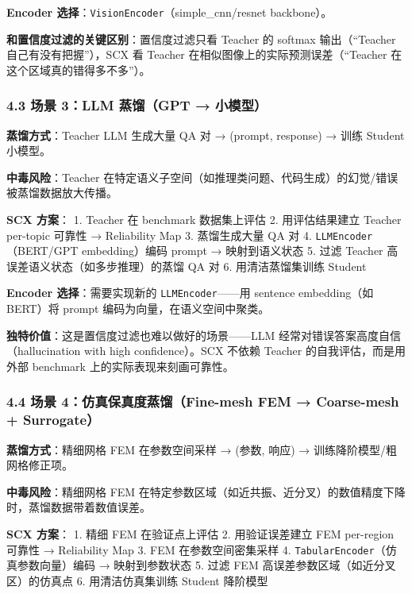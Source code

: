 \documentclass[
  12pt,
]{ctexart}
\begin{document}
\textbf{Encoder 选择}：\texttt{VisionEncoder}（simple\_cnn/resnet
backbone）。

\textbf{和置信度过滤的关键区别}：置信度过滤只看 Teacher 的 softmax
输出（``Teacher 自己有没有把握''），SCX 看 Teacher
在相似图像上的实际预测误差（``Teacher 在这个区域真的错得多不多''）。

\subsubsection{4.3 场景 3：LLM 蒸馏（GPT →
小模型）}\label{ux573aux666f-3llm-ux84b8ux998fgpt-ux5c0fux6a21ux578b}

\textbf{蒸馏方式}：Teacher LLM 生成大量 QA 对 → (prompt, response) →
训练 Student 小模型。

\textbf{中毒风险}：Teacher
在特定语义子空间（如推理类问题、代码生成）的幻觉/错误被蒸馏数据放大传播。

\textbf{SCX 方案}： 1. Teacher 在 benchmark 数据集上评估 2.
用评估结果建立 Teacher per-topic 可靠性 → Reliability Map 3.
蒸馏生成大量 QA 对 4. \texttt{LLMEncoder}（BERT/GPT embedding）编码
prompt → 映射到语义状态 5. 过滤 Teacher
高误差语义状态（如多步推理）的蒸馏 QA 对 6. 用清洁蒸馏集训练 Student

\textbf{Encoder 选择}：需要实现新的 \texttt{LLMEncoder}------用 sentence
embedding（如 BERT）将 prompt 编码为向量，在语义空间中聚类。

\textbf{独特价值}：这是置信度过滤也难以做好的场景------LLM
经常对错误答案高度自信（hallucination with high confidence）。SCX 不依赖
Teacher 的自我评估，而是用外部 benchmark 上的实际表现来刻画可靠性。

\subsubsection{4.4 场景 4：仿真保真度蒸馏（Fine-mesh FEM → Coarse-mesh +
Surrogate）}\label{ux573aux666f-4ux4effux771fux4fddux771fux5ea6ux84b8ux998ffine-mesh-fem-coarse-mesh-surrogate}

\textbf{蒸馏方式}：精细网格 FEM 在参数空间采样 → (参数, 响应) →
训练降阶模型/粗网格修正项。

\textbf{中毒风险}：精细网格 FEM
在特定参数区域（如近共振、近分叉）的数值精度下降时，蒸馏数据带着数值误差。

\textbf{SCX 方案}： 1. 精细 FEM 在验证点上评估 2. 用验证误差建立 FEM
per-region 可靠性 → Reliability Map 3. FEM 在参数空间密集采样 4.
\texttt{TabularEncoder}（仿真参数向量）编码 → 映射到参数状态 5. 过滤 FEM
高误差参数区域（如近分叉区）的仿真点 6. 用清洁仿真集训练 Student
降阶模型
\end{document}
